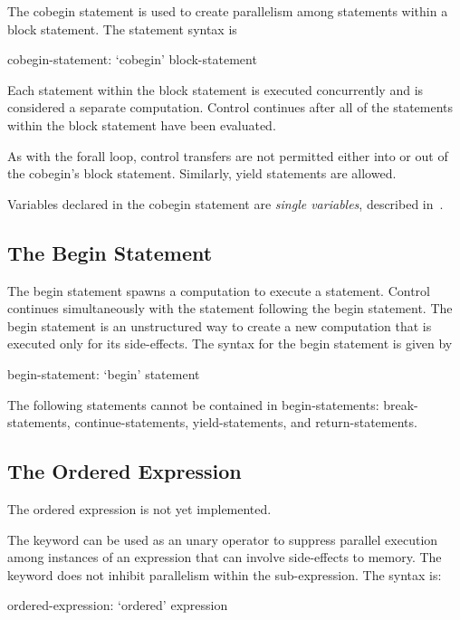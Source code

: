 The cobegin statement is used to create parallelism among statements
within a block statement. The  statement syntax is
\begin{syntax}
cobegin-statement:
  `cobegin' block-statement
\end{syntax}
Each statement within the block statement is executed concurrently and
is considered a separate computation.  Control continues after all of
the statements within the block statement have been evaluated.

As with the forall loop, control transfers are not permitted
either into or out of the cobegin's block statement. Similarly,
yield statements are allowed.

Variables declared in the cobegin statement are {\em single variables},
described in~.

\subsection{The Begin Statement}
\label{Begin}

The begin statement spawns a computation to execute a statement.
Control continues simultaneously with the statement following the
begin statement. The begin statement is an unstructured way to create
a new computation that is executed only for its side-effects. The
syntax for the begin statement is given by
\begin{syntax}
begin-statement:
  `begin' statement
\end{syntax}

The following statements cannot be contained in begin-statements:
break-statements, continue-statements, yield-statements, and
return-statements.

\subsection{The Ordered Expression}
\label{Ordered_Expressions}

\begin{status}
The ordered expression is not yet implemented.
\end{status}

The  keyword can be used as an unary operator to suppress
parallel execution among instances of an expression that can involve
side-effects to memory.  The  keyword does not inhibit
parallelism within the sub-expression.  The syntax is:
\begin{syntax}
ordered-expression:
   `ordered' expression
\end{syntax}

